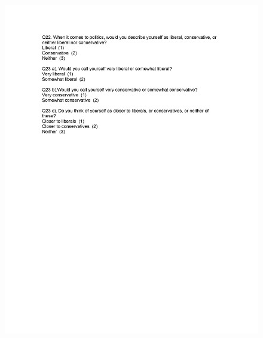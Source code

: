 \documentclass[12pt,econ]{sources/authesis}
\makeatletter
\def\maxwidth{\ifdim\Gin@nat@width>\linewidth\linewidth
\else\Gin@nat@width\fi}
\let\Oldincludegraphics\includegraphics
\renewcommand{\includegraphics}[1]{\Oldincludegraphics[width=\maxwidth]{#1}}
\makeatother
\begin{document}
\begin{figure}[hbt]
  \centering
\includegraphics{data/framing/appendix/questionnaire/questionnaire11.jpg}
\end{figure}
\end{document}
